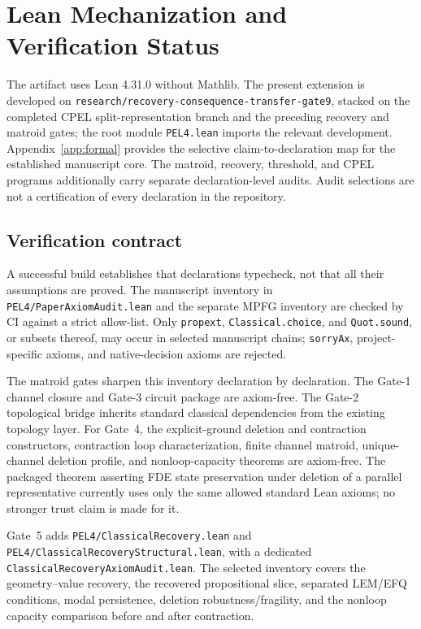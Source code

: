 \section{Lean Mechanization and Verification Status}
\label{sec:mechanization}

The artifact uses Lean 4.31.0 without Mathlib. The present extension is developed
on \texttt{research/recovery-consequence-transfer-gate9}, stacked on the completed
CPEL split-representation branch and the preceding recovery and matroid gates; the
root module \texttt{PEL4.lean} imports the relevant development.
Appendix~\ref{app:formal} provides the selective claim-to-declaration map for the
established manuscript core. The matroid, recovery, threshold, and CPEL programs
additionally carry separate declaration-level audits. Audit selections are not a
certification of every declaration in the repository.

\subsection{Verification contract}
A successful build establishes that declarations typecheck, not that all their
assumptions are proved. The manuscript inventory in
\texttt{PEL4/PaperAxiomAudit.lean} and the separate MPFG inventory are checked by CI
against a strict allow-list. Only \texttt{propext},
\texttt{Classical.choice}, and \texttt{Quot.sound}, or subsets thereof, may occur
in selected manuscript chains; \texttt{sorryAx}, project-specific axioms, and
native-decision axioms are rejected.

The matroid gates sharpen this inventory declaration by declaration. The Gate-1
channel closure and Gate-3 circuit package are axiom-free. The Gate-2 topological
bridge inherits standard classical dependencies from the existing topology layer.
For Gate~4, the explicit-ground deletion and contraction constructors, contraction
loop characterization, finite channel matroid, unique-channel deletion profile,
and nonloop-capacity theorems are axiom-free. The packaged theorem asserting FDE
state preservation under deletion of a parallel representative currently uses only
the same allowed standard Lean axioms; no stronger trust claim is made for it.

Gate~5 adds \texttt{PEL4/ClassicalRecovery.lean} and
\texttt{PEL4/ClassicalRecoveryStructural.lean}, with a dedicated
\texttt{ClassicalRecoveryAxiomAudit.lean}. The selected inventory covers the
geometry--value recovery, the recovered propositional slice, separated LEM/EFQ
conditions, modal persistence, deletion robustness/fragility, and the nonloop
capacity comparison before and after contraction.

